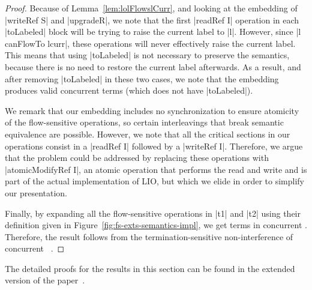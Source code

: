 \begin{proof} Because of Lemma~\ref{lem:lolFlowslCurr}, and
  looking at the embedding of |writeRef S| and |upgradeR|, we note
  that the first |readRef I| operation in each |toLabeled| block will
  be trying to raise the current label to |l|. However, since |l
  canFlowTo lcurr|, these operations will never effectively raise the
  current label. This means that using |toLabeled| is not necessary to
  preserve the semantics, because there is no need to restore the
  current label afterwards. As a result, and after removing
  |toLabeled| in these two cases, we note that the embedding produces
  valid concurrent \lio{} terms (which does not have |toLabeled|).

  We remark that our embedding includes no synchronization to
  ensure atomicity of the flow-sensitive operations, so certain
  interleavings that break semantic equivalence are possible. However,
  we note that all the critical sections in our operations consist in
  a |readRef I| followed by a |writeRef I|. Therefore, we argue that
  the problem could be addressed by replacing these operations with
  |atomicModifyRef I|, an atomic operation that performs the read and write and
  is part of the actual implementation of LIO, but which we elide in order to
  simplify our presentation.

  Finally, by expanding all the flow-sensitive operations in |t1| and |t2|
  using their definition given in
  Figure~\ref{fig:fs-exts-semantics-impl}, we get terms in concurrent
  \lio{}.  Therefore, the result follows from the
  termination-sensitive non-interference of concurrent
  \lio{}~\citep{stefan:addressing-covert}.
\end{proof}

The detailed proofs for the results in this section can be found in the
extended version of the paper~\cite{extended}.


